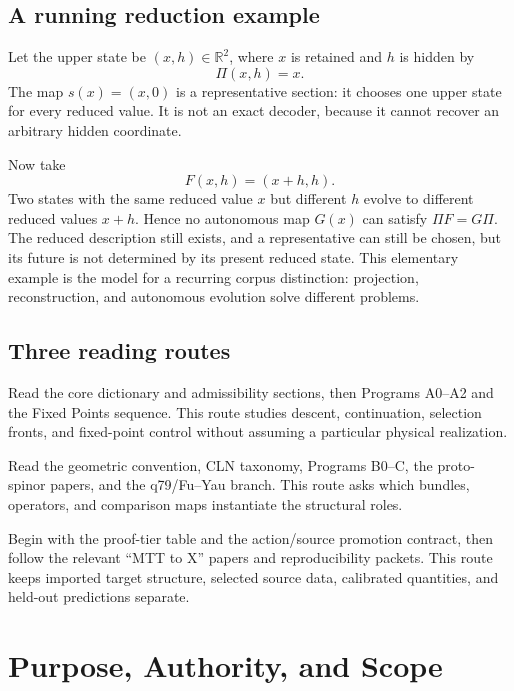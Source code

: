 \documentclass[11pt]{article}
\begin{document}
\subsection{A running reduction example}

Let the upper state be $(x,h)\in\mathbb R^2$, where $x$ is retained and $h$ is
hidden by
\[
 \Pi(x,h)=x.
\]
The map $s(x)=(x,0)$ is a representative section: it chooses one upper state
for every reduced value.  It is not an exact decoder, because it cannot recover
an arbitrary hidden coordinate.

Now take
\[
 F(x,h)=(x+h,h).
\]
Two states with the same reduced value $x$ but different $h$ evolve to
different reduced values $x+h$.  Hence no autonomous map $G(x)$ can satisfy
$\Pi F=G\Pi$.  The reduced description still exists, and a representative can
still be chosen, but its future is not determined by its present reduced state.
This elementary example is the model for a recurring corpus distinction:
projection, reconstruction, and autonomous evolution solve different
problems.

\subsection{Three reading routes}

\begin{description}[leftmargin=3.0cm,style=nextline]
\item[Structural route.]
Read the core dictionary and admissibility sections, then Programs A0--A2 and
the Fixed Points sequence.  This route studies descent, continuation,
selection fronts, and fixed-point control without assuming a particular
physical realization.
\item[Realization route.]
Read the geometric convention, CLN taxonomy, Programs B0--C, the
proto-spinor papers, and the q79/Fu--Yau branch.  This route asks which
bundles, operators, and comparison maps instantiate the structural roles.
\item[Physical route.]
Begin with the proof-tier table and the action/source promotion contract, then
follow the relevant ``MTT to X'' papers and reproducibility packets.  This
route keeps imported target structure, selected source data, calibrated
quantities, and held-out predictions separate.
\end{description}

\section{Purpose, Authority, and Scope}
\end{document}
